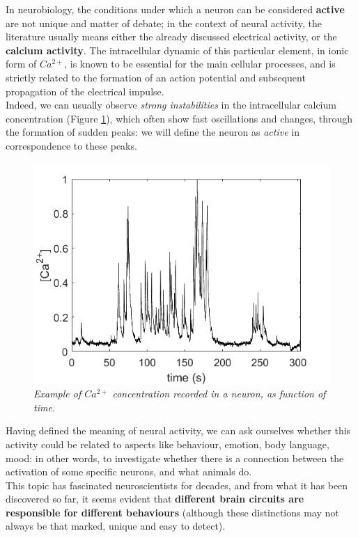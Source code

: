 \documentclass[12pt, a4paper]{report}
\begin{document}
In neurobiology, the conditions under which a neuron can be considered \textbf{active} are not unique and matter of debate; in the context of neural activity, the literature usually means either the already discussed electrical activity, or the \textbf{calcium activity}. The intracellular dynamic of this particular element, in ionic form of $Ca^{2+}$, is known to be essential for the main cellular processes, and is strictly related to the formation of an action potential and subsequent propagation of the electrical impulse.\\
 Indeed, we can usually observe  \textit{strong instabilities} in the intracellular calcium concentration (Figure \ref{oscillations}), which often show fast oscillations and changes, through the formation of sudden peaks: we will define the neuron as \textit{active} in correspondence to these peaks.

\begin{figure}[H]
	\begin{center}
		\includegraphics[scale=.50]{Ca_conc.png} 
	\end{center} 
	\caption{\textit{Example of $Ca^{2+}$ concentration recorded in a neuron, as function of time.}} \label{oscillations}
		
	\end{figure}
	
	Having defined the meaning of neural activity, we can ask ourselves whether this activity could be related to aspects like behaviour, emotion, body language, mood: in other words, to investigate whether there is a connection between the activation of some specific neurons, and what animals do.\\
	This topic has fascinated neuroscientists for decades, and from what it has been discovered so far, it seems evident that \textbf{different brain circuits are responsible for different behaviours} (although these distinctions may not always be that marked, unique and easy to detect).
\end{document}

